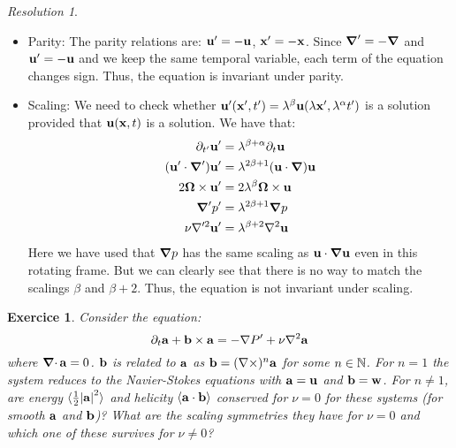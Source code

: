\documentclass[10pt,a4paper]{article}
\newtheorem{exercici}{Exercice}
\theoremstyle{definition}
\theoremstyle{remark}
\newtheorem*{res}{Resolution}
\begin{document}
\begin{res}
\begin{itemize}
    \item Parity: The parity relations are: $\boldsymbol{\mathrm{u}}' = -\boldsymbol{\mathrm{u}}$, $\boldsymbol{\mathrm{x}}' = -\boldsymbol{\mathrm{x}}$. Since $\grad'=-\grad$ and $\boldsymbol{\mathrm{u}}'=-\boldsymbol{\mathrm{u}}$ and we keep the same temporal variable, each term of the equation changes sign. Thus, the equation is invariant under parity.
    \item Scaling: We need to check whether $\boldsymbol{\mathrm{u}}'(\boldsymbol{\mathrm{x}}',t') = \lambda^\beta\boldsymbol{\mathrm{u}}(\lambda\boldsymbol{\mathrm{x}}',\lambda^\alpha t')$ is a solution provided that $\boldsymbol{\mathrm{u}}(\boldsymbol{\mathrm{x}},t)$ is a solution. We have that:
          \begin{align*}
            \partial_{t'}\boldsymbol{\mathrm{u}}'        & =\lambda^{\beta+\alpha}\partial_t\boldsymbol{\mathrm{u}}      \\
            (\boldsymbol{\mathrm{u}}'\cdot\grad')\boldsymbol{\mathrm{u}}' & = \lambda^{2\beta+1}(\boldsymbol{\mathrm{u}}\cdot\grad)\boldsymbol{\mathrm{u}} \\
            2\boldsymbol{\mathrm{\Omega}}\times\boldsymbol{\mathrm{u}}'     & = 2\lambda^\beta\boldsymbol{\mathrm{\Omega}}\times\boldsymbol{\mathrm{u}}        \\
            \grad' p'                   & = \lambda^{2\beta+1}\grad p                  \\
            \nu\nabla'^2\boldsymbol{\mathrm{u}}'         & = \lambda^{\beta+2}\nabla^2\boldsymbol{\mathrm{u}}
          \end{align*}
          Here we have used that $\grad p$ has the same scaling as $\boldsymbol{\mathrm{u}}\cdot\grad\boldsymbol{\mathrm{u}}$  even in this rotating frame. But we can clearly see that there is no way to match the scalings $\beta$ and $\beta+2$. Thus, the equation is not invariant under scaling.
  \end{itemize}
\end{res}
\begin{exercici}
  Consider the equation:
  \begin{equation*}
    \partial_t\boldsymbol{\mathrm{a}} + \boldsymbol{\mathrm{b}}\times\boldsymbol{\mathrm{a}} = -\nabla P' + \nu\nabla^2\boldsymbol{\mathrm{a}}
  \end{equation*}
  where $\operatorname{\boldsymbol{\mathrm{\nabla}}\cdot}\boldsymbol{\mathrm{a}}=0$. $\boldsymbol{\mathrm{b}}$ is related to $\boldsymbol{\mathrm{a}}$ as $\boldsymbol{\mathrm{b}} = (\nabla\times)^n\boldsymbol{\mathrm{a}}$ for some $n\in\mathbb{N}$. For $n=1$ the system reduces to the Navier-Stokes equations with $\boldsymbol{\mathrm{a}} = \boldsymbol{\mathrm{u}}$ and $\boldsymbol{\mathrm{b}} = \boldsymbol{\mathrm{w}}$. For $n\neq 1$, are energy $\langle \frac{1}{2} \abs{\boldsymbol{\mathrm{a}}}^2\rangle$ and helicity $\langle \boldsymbol{\mathrm{a}}\cdot\boldsymbol{\mathrm{b}}\rangle$ conserved for $\nu=0$ for these systems (for smooth $\boldsymbol{\mathrm{a}}$ and $\boldsymbol{\mathrm{b}}$)? What are the scaling symmetries they have for $\nu=0$ and which one of these survives for $\nu\neq 0$?
\end{exercici}
\end{document}
